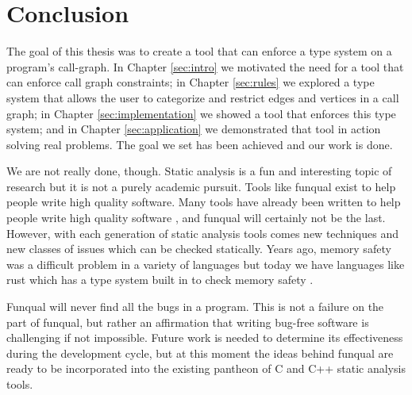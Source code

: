 \chapter{Conclusion}\label{sec:conclusion}

The goal of this thesis was to create a tool that can enforce a type system on a program's call-graph.  In Chapter \ref{sec:intro} we motivated the need for a tool that can enforce call graph constraints; in Chapter \ref{sec:rules} we explored a type system that allows the user to categorize and restrict edges and vertices in a call graph; in Chapter \ref{sec:implementation} we showed a tool that enforces this type system; and in Chapter \ref{sec:application} we demonstrated that tool in action solving real problems.  The goal we set has been achieved and our work is done. 

We are not really done, though.  Static analysis is a fun and interesting topic of research but it is not a purely academic pursuit.  Tools like funqual exist to help people write high quality software.  Many tools have already been written to help people write high quality software \cite{jqual-inference, staticanal, lclint-og, lclint-memory}, and funqual will certainly not be the last.  However, with each generation of static analysis tools comes new techniques and new classes of issues which can be checked statically.  Years ago, memory safety was a difficult problem in a variety of languages but today we have languages like rust which has a type system built in to check memory safety \cite{rust-is-dope}.  

Funqual will never find all the bugs in a program.  This is not a failure on the part of funqual, but rather an affirmation that writing bug-free software is challenging if not impossible.  Future work is needed to determine its effectiveness during the development cycle, but at this moment the ideas behind funqual are ready to be incorporated into the existing pantheon of C and C++ static analysis tools.  
